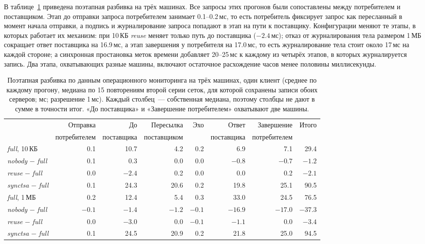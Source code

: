 \documentclass[conference,a4paper]{IEEEtran}
\begin{document}
В таблице~\ref{tab:stages} приведена поэтапная разбивка на трёх машинах. Все запросы этих прогонов
были сопоставлены между потребителем и поставщиком. Этап до отправки запроса потребителем занимает
0.1--0.2\,мс, то есть потребитель фиксирует запрос как пересланный в момент начала отправки, а подпись и
журналирование запроса попадают в этап на пути к поставщику. Конфигурации меняют те
этапы, в которых работает их механизм: при 10\,КБ \emph{reuse} меняет только путь до поставщика ($-2.4$\,мс);
отказ от журналирования тела размером 1\,МБ сокращает ответ поставщика на 16.9\,мс, а этап завершения
у потребителя на 17.0\,мс, то есть журналирование тела стоит около 17\,мс на каждой стороне; а синхронная
простановка меток времени добавляет 20--25\,мс к каждому из четырёх этапов, в которых журналируется запись. Два этапа,
охватывающих разные машины, включают остаточное расхождение часов менее половины миллисекунды.

\begin{table}[!tb]
\centering\small
\caption{Поэтапная разбивка по данным операционного мониторинга на трёх машинах, один клиент (среднее
по каждому прогону, медиана по 15 повторениям второй серии сеток, для которой сохранены записи обоих
серверов; мс; разрешение 1\,мс). Каждый столбец~--- собственная медиана, поэтому столбцы
не дают в сумме в точности итог. «До поставщика» и «Завершение
потребителем» охватывают две машины.}
\label{tab:stages}
\begin{tabular}{@{}lrrrrrrr@{}}
\toprule
& Отправка & До & Пересылка & Эхо & Ответ & Завершение & Итого \\
& потребителем & поставщика & поставщиком & & поставщика & потребителем & \\
\midrule
\emph{full}, 10\,КБ & 0.1 & 10.7 & 4.2 & 0.2 & 6.9 & 7.1 & 29.4 \\
\quad \emph{nobody} $-$ \emph{full} & 0.1 & 0.3 & 0.0 & 0.0 & $-0.8$ & $-0.7$ & $-1.2$ \\
\quad \emph{reuse} $-$ \emph{full} & 0.0 & $-2.4$ & 0.2 & 0.0 & 0.0 & 0.2 & $-2.1$ \\
\quad \emph{synctsa} $-$ \emph{full} & 0.1 & 24.3 & 20.6 & 0.2 & 19.8 & 25.1 & 90.5 \\
\midrule
\emph{full}, 1\,МБ & 0.2 & 12.4 & 5.4 & 0.3 & 33.0 & 24.5 & 76.5 \\
\quad \emph{nobody} $-$ \emph{full} & $-0.1$ & $-1.4$ & $-1.2$ & $-0.1$ & $-16.9$ & $-17.0$ & $-37.3$ \\
\quad \emph{reuse} $-$ \emph{full} & 0.0 & $-3.0$ & 0.0 & $-0.1$ & $-1.1$ & 0.0 & $-3.4$ \\
\quad \emph{synctsa} $-$ \emph{full} & 0.1 & 24.5 & 20.9 & 0.2 & 21.8 & 25.0 & 94.5 \\
\bottomrule
\end{tabular}
\end{table}
\end{document}
